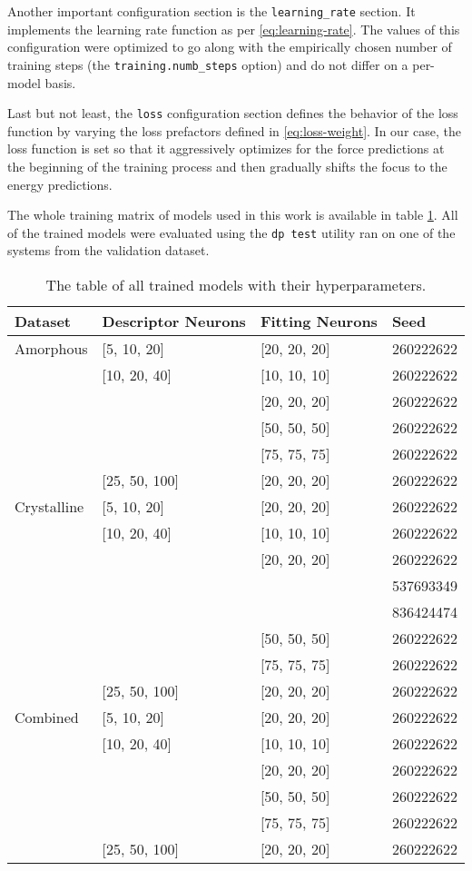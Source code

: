 Another important configuration section is the \texttt{learning\_rate}
section. It implements the learning rate function as per
\eqref{eq:learning-rate}. The values of this configuration were optimized to
go along with the empirically chosen number of training steps
(the \texttt{training.numb\_steps} option) and do not differ on a per-model
basis.

Last but not least, the \texttt{loss} configuration section defines the
behavior of the loss function by varying the loss prefactors defined in
\eqref{eq:loss-weight}. In our case, the loss function is set so that it
aggressively optimizes for the force predictions at the beginning of the
training process and then gradually shifts the focus to the energy
predictions.

The whole training matrix of models used in this work is available in table
\ref{tab:models}. All of the trained models were evaluated using the
\texttt{dp test} utility ran on one of the systems from the validation
dataset.

\begin{table}
  \begin{tabularx}{\textwidth}{llll}
    \toprule
    Dataset & Descriptor Neurons & Fitting Neurons & Seed \\
    \midrule
    Amorphous & [5, 10, 20] & [20, 20, 20] & 260222622 \\
     & [10, 20, 40] & [10, 10, 10] & 260222622 \\
     & & [20, 20, 20] & 260222622 \\
     & & [50, 50, 50] & 260222622 \\
     & & [75, 75, 75] & 260222622 \\
     & [25, 50, 100] & [20, 20, 20] & 260222622 \\
    \midrule
    Crystalline & [5, 10, 20] & [20, 20, 20] & 260222622 \\
     & [10, 20, 40] & [10, 10, 10] & 260222622 \\
     & & [20, 20, 20] & 260222622 \\
     & & & 537693349 \\
     & & & 836424474 \\
     & & [50, 50, 50] & 260222622 \\
     & & [75, 75, 75] & 260222622 \\
     & [25, 50, 100] & [20, 20, 20] & 260222622 \\
    \bottomrule
    Combined & [5, 10, 20] & [20, 20, 20] & 260222622 \\
     & [10, 20, 40] & [10, 10, 10] & 260222622 \\
     & & [20, 20, 20] & 260222622 \\
     & & [50, 50, 50] & 260222622 \\
     & & [75, 75, 75] & 260222622 \\
     & [25, 50, 100] & [20, 20, 20] & 260222622 \\
  \end{tabularx}
  \caption{The table of all trained models with their hyperparameters.}
  \label{tab:models}
\end{table}

